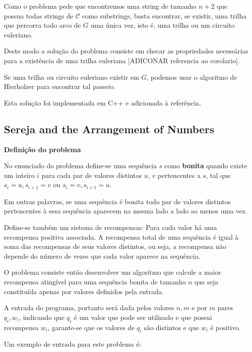 \documentclass[12pt, a4paper]{article}
\begin{document}
        Como o problema pede que encontremos uma string de tamanho $n+2$ que possua todas strings de $\mathcal{C}$ como substrings, basta encontrar, se existir, uma trilha que percorra todo arco de $G$ uma única vez, isto é, uma trilha ou um circuito euleriano.

        Deste modo a solução do problema consiste em checar as propriedades necessárias para a existência de uma trilha euleriana [ADICONAR referencia ao corolario].

        Se uma trilha ou circuito euleriano existir em $G$, podemos usar o algoritmo de Hierholzer para encontrar tal passeio.

        Esta solução foi implementada em C++ e adicionada à referência\cite{tanya-sol}.

        \subsection{Sereja and the Arrangement of Numbers\cite{sereja}}

        \textbf{Definição do problema}

        No enunciado do problema define-se uma sequência $s$ como \textbf{bonita} quando existe um inteiro $i$ para cada par de valores distintos $u$, $v$ pertencentes a $s$, tal que $s_i = u, s_{i+1} = v$ ou $s_i = v, s_{i+1} = u$.

        Em outras palavras, se uma sequência é bonita todo par de valores distintos pertencentes à essa sequência aparecem na mesma lado a lado ao menos uma vez.

        Define-se também um sistema de recompensas:
        Para cada valor há uma recompensa positiva associada.
        A recompensa total de uma sequência é igual à soma das recompensas de seus valores distintos, ou seja, a recompensa não depende do número de vezes que cada valor aparece na sequência.

        O problema consiste então desenvolver um algoritmo que calcule a maior recompensa atingível para uma sequência bonita de tamanho $n$ que seja constituída apenas por valores definidos pela entrada. 

        A entrada do programa, portanto será dada pelos valores $n, m$ e por $m$ pares $q_i, w_i$, indicando que $q_i$ é um valor que pode ser utilizado e que possui recompensa $w_i$, garante-se que os valores de $q_i$ são distintos e que $w_i$ é positivo.

        Um exemplo de entrada para este problema é:
\end{document}
